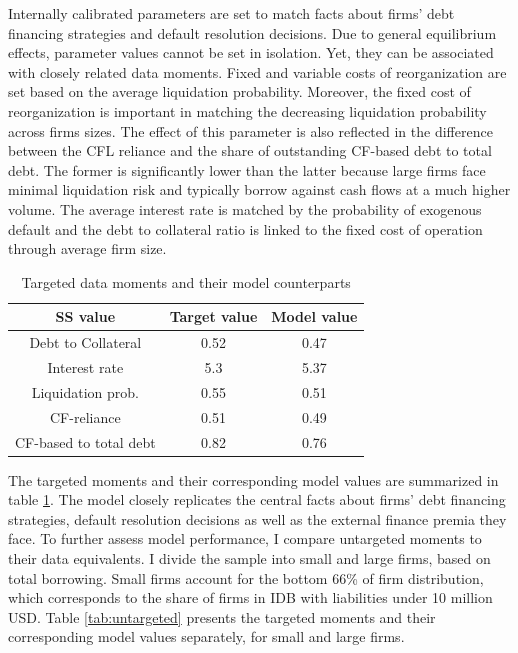 \documentclass[12pt]{article}
\begin{document}
\noindent Internally calibrated parameters are set to match facts about firms' debt financing strategies and default resolution decisions. Due to general equilibrium effects, parameter values cannot be set in isolation. Yet, they can be associated with closely related data moments. Fixed and variable costs of reorganization are set based on the average liquidation probability. Moreover, the fixed cost of reorganization is important in matching the decreasing liquidation probability across firms sizes. The effect of this parameter is also reflected in the difference between the CFL reliance and the share of outstanding CF-based debt to total debt. The former is significantly lower than the latter because large firms face minimal liquidation risk and typically borrow against cash flows at a much higher volume. The average interest rate is matched by the probability of exogenous default and the debt to collateral ratio is linked to the fixed cost of operation through average firm size. 

\begin{table}[h!]
    \centering
    \begin{tabular}{c|cc}
    \toprule
    \textbf{SS value} & \textbf{Target value} & \textbf{Model value} \\ 
    \midrule
    Debt to Collateral & 0.52 & 0.47 \\ 
    Interest rate & 5.3 & 5.37 \\ 
    Liquidation prob. & 0.55 & 0.51 \\ 
    CF-reliance & 0.51 & 0.49 \\ 
    CF-based to total debt & 0.82 & 0.76 \\ 
    \bottomrule
    \end{tabular}
    \caption{Targeted data moments and their model counterparts}
    \label{tab:targets}
\end{table}

\noindent The targeted moments and their corresponding model values are summarized in table \ref{tab:targets}. The model closely replicates the central facts about firms' debt financing strategies, default resolution decisions as well as the external finance premia they face. To further assess model performance, I compare untargeted moments to their data equivalents. I divide the sample into small and large firms, based on total borrowing. Small firms account for the bottom 66\% of firm distribution, which corresponds to the share of firms in IDB with liabilities under 10 million USD. Table \ref{tab:untargeted} presents the targeted moments and their corresponding model values separately, for small and large firms.
\end{document}
